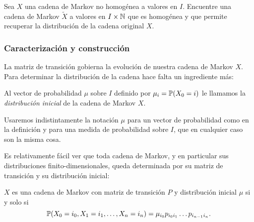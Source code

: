\vskip1pt

\begin{exer}
Sea $X$ una cadena de Markov no homogénea a valores en $I$.
Encuentre una cadena de Markov $\tilde X$ a valores en $I\times\mathbb{N}$ que es homogénea y que permite recuperar la distribución de la cadena original $X$. 
\end{exer}

\subsubsection{Caracterización y construcción}

La matriz de transición gobierna la evolución de nuestra cadena de Markov $X$.
Para determinar la distribución de la cadena hace falta un ingrediente más:

\begin{defn}
Al vector de probabilidad $\mu$ sobre $I$ definido por $\mu_i=\mathbb{P}(X_0=i)$ le llamamos la \emph{distribución inicial} de la cadena de Markov $X$.
\end{defn}

Usaremos indistintamente la notación $\mu$ para un vector de probabilidad como en la definición y para una medida de probabilidad sobre $I$, que en cualquier caso son la misma cosa.

Es relativamente fácil ver que toda cadena de Markov, y en particular sus distribuciones finito-dimensionales, queda determinada por su matriz de transición y su distribución inicial:

\begin{prop}\label{prop:caractMarkov}
$X$ es una cadena de Markov con matriz de transición $P$ y distribución inicial $\mu$ si y solo si
\[\mathbb{P}(X_0=i_0,X_1=i_1,\dotsc,X_n=i_n)=\mu_{i_0}p_{i_0i_1}\dotsc p_{i_{n-1}i_n}.\]
\end{prop}

